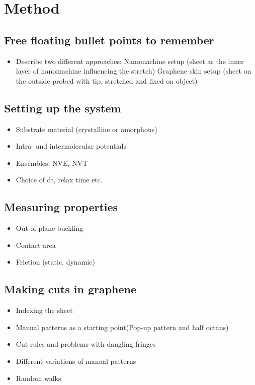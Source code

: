\newpage
\chapter*{Method}

\section*{Free floating bullet points to remember}
\begin{itemize}
  \item Describe two different approaches:
  \subitem Nanomachine setup (sheet as the inner layer of nanomachine influencing the stretch)
  \subitem Graphene skin setup (sheet on the outside probed with tip, stretched and fixed on object)
\end{itemize}


\section*{Setting up the system}
\begin{itemize}
  \item Substrate material (crystalline or amorphous)
  \item Intra- and intermolecular potentials
  \item Ensembles: NVE, NVT
  \item Choice of dt, relax time etc.  
\end{itemize}
\section*{Measuring properties}
\begin{itemize}
  \item Out-of-plane buckling
  \item Contact area
  \item Friction (static, dynamic)
\end{itemize}


\section*{Making cuts in graphene}
\begin{itemize}
  \item Indexing the sheet
  \item  Manual patterns as a starting point(Pop-up pattern and half octans) 
  \item Cut rules and problems with dangling fringes
  \item Different variations of manual patterns 
  \item Random walks 
\end{itemize}

